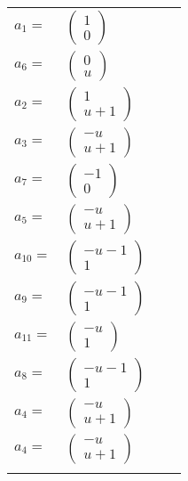 \documentclass[1p]{elsarticle_modified}
\theoremstyle{definition}
\begin{document}
\begin{tabular}{m{7pt} m{180pt} m{7pt} m{180pt} }
\flushright $a_{1}=$&$\begin{pmatrix}1\\0\end{pmatrix}$ \\
\flushright $a_{6}=$&$\begin{pmatrix}0\\u\end{pmatrix}$ \\
\flushright $a_{2}=$&$\begin{pmatrix}1\\u+1\end{pmatrix}$ \\
\flushright $a_{3}=$&$\begin{pmatrix}- u\\u+1\end{pmatrix}$ \\
\flushright $a_{7}=$&$\begin{pmatrix}-1\\0\end{pmatrix}$ \\
\flushright $a_{5}=$&$\begin{pmatrix}- u\\u+1\end{pmatrix}$ \\
\flushright $a_{10}=$&$\begin{pmatrix}- u-1\\1\end{pmatrix}$ \\
\flushright $a_{9}=$&$\begin{pmatrix}- u-1\\1\end{pmatrix}$ \\
\flushright $a_{11}=$&$\begin{pmatrix}- u\\1\end{pmatrix}$ \\
\flushright $a_{8}=$&$\begin{pmatrix}- u-1\\1\end{pmatrix}$ \\
\flushright $a_{4}=$&$\begin{pmatrix}- u\\u+1\end{pmatrix}$\\ \flushright $a_{4}=$&$\begin{pmatrix}- u\\u+1\end{pmatrix}$\\&\end{tabular}
\end{document}
